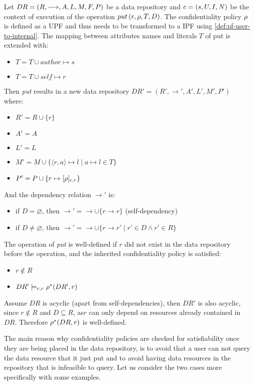 \begin{definition}
Let $DR= \left( R, \longrightarrow, A, L, M, F, P \right)$ be a data repository and $c = \left( s, U, I, N \right)$ be the context of execution of the operation $put \left( r, \rho, T, D \right)$. The confidentiality policy $\rho$ is defined as a UPF and thus needs to be transformed to a IPF using \autoref{def:pf-user-to-internal}. The mapping between attributes names and literals $T$ of put is extended with: 
\begin{itemize}
    \item $T = T \cup author \mapsto s$
    \item $T = T \cup self \mapsto r$
\end{itemize}
Then \emph{put} results in a new data repository $DR'=\left(R', \longrightarrow', A', L', M', P' \right)$ where:
\begin{itemize}
    \item $R' = R \cup \{r\}$
    \item $A' = A$
    \item $L' = L$
    \item $M' = M \cup \{ \langle r,a \rangle \mapsto l \mid a \mapsto l \in T \}$
    \item $P' = P \cup \{ r \mapsto [\rho]_{c,r} \}$
\end{itemize}
And the dependency relation $\longrightarrow'$ is:
\begin{itemize}
    \item if $D = \varnothing$, then $\longrightarrow' = \longrightarrow \cup \{r \longrightarrow r\}$ (self-dependency)
    \item if $D \neq \varnothing$, then $\longrightarrow' = \longrightarrow \cup \{r \longrightarrow r' \mid r' \in D \land r' \in R \}$
\end{itemize}
The operation of \emph{put} is well-defined if $r$ did not exist in the data repository before the operation, and the inherited confidentiality policy is satisfied:
\begin{itemize}
    \item $r \not\in R$
    \item $DR' \models_{c,r} \rho^{\ast}(DR',r)$
\end{itemize}
Assume $DR$ is acyclic (apart from self-dependencies), then $DR'$ is also acyclic, since $r \notin R$ and $D \subseteq R$, as$r$ can only depend on resources already contained in $DR$. Therefore $\rho^{\ast}(DR,r)$ is well-defined.
\end{definition}

The main reason why confidentiality policies are checked for satisfiability once they are being placed in the data repository, is to avoid that a user can not query the data resource that it just put and to avoid having data resources in the repository that is infeasible to query. Let us consider the two cases more specifically with some examples.

